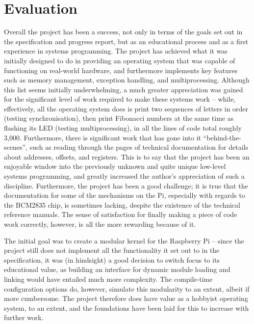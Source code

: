 \section{Evaluation}
    \label{sec:evaluation}
    Overall the project has been a success, not only in terms of the goals set
    out in the specification and progress report, but as an educational
    process and as a first experience in systems programming. The project has
    achieved what it was initially designed to do in providing an operating
    system that was capable of functioning on real-world hardware, and
    furthermore implements key features such as memory management, exception
    handling, and multiprocessing. Although this list seems initially
    underwhelming, a much greater appreciation was gained for the significant
    level of work required to make these systems work -- while, effectively, all
    the operating system does is print two sequences of letters in order
    (testing synchronisation), then print Fibonacci numbers at the same time as
    flashing its LED (testing multiprocessing), in all the lines of code total
    roughly 3,000. Furthermore, there is significant work that has gone into it
    ``behind-the-scenes'', such as reading through the pages of technical
    documentation for details about addresses, offsets, and registers. This is
    to say that the project has been an enjoyable window into the previously
    unknown and quite unique low-level systems programming, and greatly
    increased the author's appreciation of such a discipline. Furthermore, the
    project has been a good challenge; it is true that the documentation for
    some of the mechanisms on the Pi, especially with regards to the BCM2835
    chip, is sometimes lacking, despite the existence of the technical reference
    manuals. The sense of satisfaction for finally making a piece of code work
    correctly, however, is all the more rewarding because of it.

    The initial goal was to create a modular kernel for the Raspberry Pi --
    since the project still does not implement all the functionality it set out
    to in the specification, it was (in hindsight) a good decision to switch
    focus to its educational value, as building an interface for dynamic module
    loading and linking would have entailed much more complexity. The
    compile-time configuration options do, however, simulate this modularity to
    an extent, albeit if more cumbersome. The project therefore does have value
    as a hobbyist operating system, to an extent, and the foundations have been
    laid for this to increase with further work.

